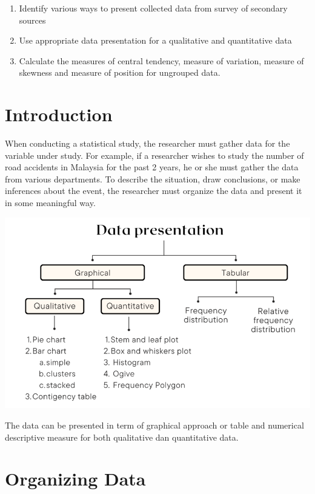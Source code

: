 \documentclass[
  a4paper,
  DIV=11,
  numbers=noendperiod,
  oneside]{scrreprt}
\providecommand{\tightlist}{%
  \setlength{\itemsep}{0pt}\setlength{\parskip}{0pt}}\usepackage{longtable,booktabs,array}
\begin{document}
\begin{enumerate}
\def\labelenumi{\arabic{enumi}.}
\tightlist
\item
  Identify various ways to present collected data from survey of
  secondary sources
\item
  Use appropriate data presentation for a qualitative and quantitative
  data
\item
  Calculate the measures of central tendency, measure of variation,
  measure of skewness and measure of position for ungrouped data.
\end{enumerate}

\hypertarget{introduction-1}{%
\section{Introduction}\label{introduction-1}}

When conducting a statistical study, the researcher must gather data for
the variable under study. For example, if a researcher wishes to study
the number of road accidents in Malaysia for the past 2 years, he or she
must gather the data from various departments. To describe the
situation, draw conclusions, or make inferences about the event, the
researcher must organize the data and present it in some meaningful way.

\includegraphics[width=6.25in,height=\textheight]{images/ch2/picture1.png}

The data can be presented in term of graphical approach or table and
numerical descriptive measure for both qualitative dan quantitative
data.

\hypertarget{organizing-data}{%
\section{Organizing Data}\label{organizing-data}}
\end{document}
